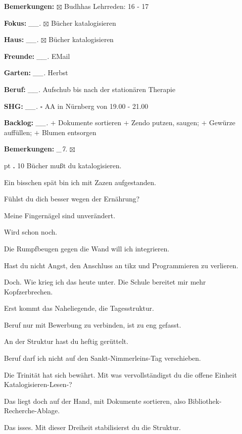\documentclass[10pt,a4paper]{article}
\newcounter{notec}
\newcommand\notep[1]{%
  \stepcounter{notec}
  \vskip #1pt
  {\bf\arabic{notec}.}
}
\newcommand\mand[1] {{\color {burntorange} {\bf #1}}}          %
\newcommand\n[1] { {\sl #1.} \hskip 5pt }
\begin{document}
\begin{mdframed}[style=daystyle]
\begin{labeling}{{\mand {Bemerkungen:}}}
      $\boxtimes$ Budhhas Lehrreden: 16 - 17
  \item[{\mand {Fokus:}}]        \n{\_\_} $\boxtimes$ Bücher katalogisieren
  \item[{\mand {Haus:}}]         \n{\_\_} $\boxtimes$ Bücher katalogisieren
  \item[{\mand {Freunde:}}]      \n{\_\_} EMail
  \item[{\mand {Garten:}}]       \n{\_\_} Herbst
  \item[{\mand {Beruf:}}]        \n{\_\_} Aufschub bis nach der stationären Therapie
  \item[{\mand {SHG:}}]          \n{\_\_} $\square$ AA in Nürnberg von 19.00 - 21.00
  \item[{\mand {Backlog:}}]      \n{\_\_} 
    $+$ Dokumente sortieren
    $+$ Zendo putzen, saugen; $+$ Gewürze auffüllen; $+$ Blumen entsorgen
  \item[{\mand {Bemerkungen:}}]   \n{\_7} $\boxtimes$
  \end{labeling}
    
  \setcounter{notec}{0}
  
  \notep 0 10 Bücher mußt du katalogisieren.

  \vskip 2pt
  Ein bisschen spät bin ich mit Zazen aufgestanden.

  \vskip 2pt
  Fühlst du dich besser wegen der Ernährung?

  \vskip 2pt
  Meine Fingernägel sind unverändert.

  \vskip 2pt
  Wird schon noch.

  \vskip 2pt
  Die Rumpfbeugen gegen die Wand will ich integrieren.

  \vskip 2pt
  Hast du nicht Angst, den Anschluss an tikz und Programmieren zu verlieren.

  \vskip 2pt
  Doch. Wie krieg ich das heute unter. Die Schule bereitet mir mehr Kopfzerbrechen.

  \vskip 2pt
  Erst kommt das Naheliegende, die Tagesstruktur.

  \vskip 2pt
  Beruf nur mit Bewerbung zu verbinden, ist zu eng gefasst.

  \vskip 2pt
  An der Struktur hast du heftig gerüttelt.

  \vskip 2pt
  Beruf darf ich nicht auf den Sankt-Nimmerleins-Tag verschieben.

  \vskip 2pt
  Die Trinität hat sich bewährt. Mit was vervollständigst du die offene Einheit
  Katalogisieren-Lesen-?

  \vskip 2pt
  Das liegt doch auf der Hand, mit Dokumente sortieren, also Bibliothek-Recherche-Ablage.

  \vskip 2pt
  Das isses. Mit dieser Dreiheit stabilisierst du die Struktur.

\end{mdframed}
\end{document}
